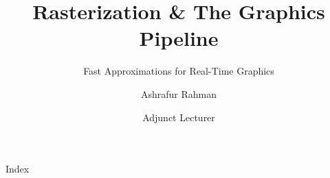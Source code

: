

\title{Rasterization \& The Graphics Pipeline}
\subtitle{Fast Approximations for Real-Time Graphics}
\author{\large Ashrafur Rahman}
\date{\small Adjunct Lecturer}



\begin{frame}
  \titlepage
\end{frame}

\begin{frame}{Index}
  \vspace{0.5cm}
  \tiny
  \tableofcontents
\end{frame}




















